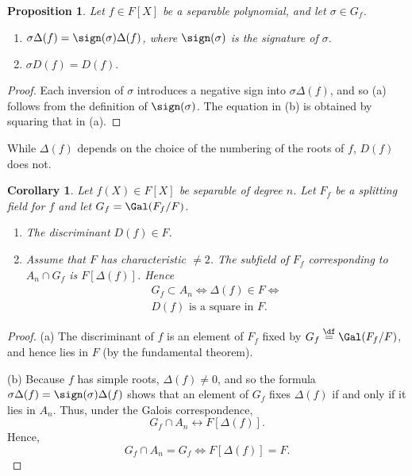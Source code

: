 \documentclass[a4paper,11pt,final,openany]{memoir}
\newtheorem{corollary}[X]{Corollary}
\newtheorem{proposition}[X]{Proposition}
\theoremstyle{nonumberplain}
\newtheorem{proof}{Proof.}
\begin{document}
\begin{proposition}
\label{cg1}Let $f\in F[X]$ be a separable polynomial, and let $\sigma\in
G_{f}$.

\begin{enumerate}
\item $\sigma\Delta(f)=\sign(\sigma)\Delta(f)$, where $\sign(\sigma)$ is the
signature of $\sigma.$

\item $\sigma D(f)=D(f).$
\end{enumerate}
\end{proposition}

\begin{proof}
Each inversion of $\sigma$ introduces a negative sign into $\sigma\Delta(f)$,
and so (a) follows from the definition of $\sign(\sigma)$. The equation in (b)
is obtained by squaring that in (a).
\end{proof}

While $\Delta(f)$ depends on the choice of the numbering of the roots of $f$,
$D(f)$ does not.

\begin{corollary}
\label{cg2}Let $f(X)\in F[X]$ be separable of degree $n$. Let $F_{f}$ be a
splitting field for $f$ and let $G_{f}=\Gal(F_{f}/F)$.

\begin{enumerate}
\item The discriminant $D(f)\in F$.

\item Assume that $F$ has characteristic $\neq 2$. The subfield of $F_{f}$ corresponding to $A_{n}\cap G_{f}$ is
$F[\Delta(f)]$. Hence
\begin{align*}
G_{f}\subset A_{n}\iff\Delta(f)\in F\iff \\
D(f)\text{\ is a square in }F.
\end{align*}

\end{enumerate}
\end{corollary}

\begin{proof}
(a) The discriminant of $f$ is an element of $F_{f}$ fixed by $G_{f}%
\overset{\df}{=}\Gal(F_{f}/F)$, and hence lies in $F$ (by the
fundamental theorem).

(b) Because $f$ has simple roots, $\Delta(f)\neq0$, and so the formula
$\sigma\Delta(f)=\sign(\sigma)\Delta(f)$ shows that an element of $G_{f}$
fixes $\Delta(f)$ if and only if it lies in $A_{n}$. Thus, under the Galois
correspondence,%
\[
G_{f}\cap A_{n}\leftrightarrow F[\Delta(f)]\text{.}%
\]
Hence,%
\[
G_{f}\cap A_{n}=G_{f}\iff F[\Delta(f)]=F.
\]

\end{proof}
\end{document}
